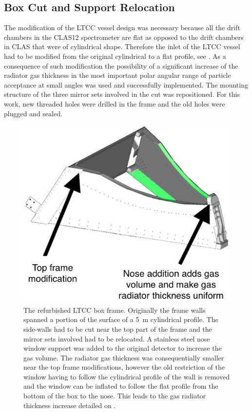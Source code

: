 \subsection{Box Cut and Support Relocation}
\label{sec:mirrorRepos}

The modification of the LTCC vessel design was necessary because all the drift chambers in the CLAS12 spectrometer
are flat as opposed to the drift chambers in CLAS that were of cylindrical shape. Therefore the inlet
of the LTCC vessel had to be modified from the original cylindrical to a flat profile, see . As a consequence of such
modification the possibility of a significant increase of the radiator gas thickness in the most important
polar angular range of particle acceptance at small angles was used and successfully implemented.
The mounting structure of the three mirror sets involved in the cut was
repositioned. For this work, new threaded holes were drilled in the frame and the old holes were plugged and sealed.

\begin{figure}[ht]
	\centering
	\includegraphics[width=1.0\columnwidth, height=0.75\columnwidth]{img/boxCut.png}
	\caption{The refurbished LTCC box frame. Originally the frame walls spanned a portion of the surface of a 5~m
          cylindrical profile. The side-walls had to be cut near the top part of the frame and the mirror
          sets involved had to be relocated. A stainless steel nose window support was added to the original detector to
          increase the gas volume. The radiator gas thickness was consequentially smaller near the top frame modifications,
          however the old restriction of the window having to follow the cylindrical profile of the wall is removed and
          the window can be inflated to follow the flat profile from the bottom of the box to the nose. This leads
          to the gas radiator thickness increase detailed on . }
	\label{fig:boxCut}
\end{figure}

